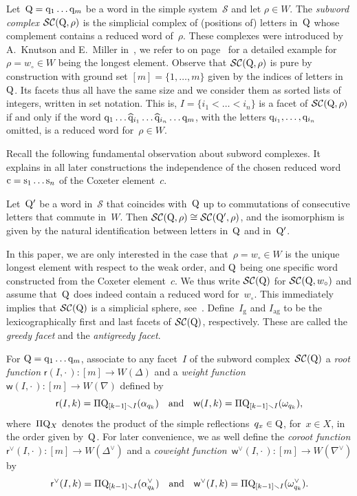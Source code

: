 \documentclass[ALCO,Unicode,ThmDefs]{cedram}
\newcommand{\ssm}{\smallsetminus}
\newcommand{\Dfn}[1]{\emph{#1}}
\newcommand{\subwordComplex}{\mathcal{SC}}
\newcommand{\greedy}{I_{\operatorname{g}}}
\newcommand{\antigreedy}{I_{\operatorname{ag}}}
\newcommand{\sq}[1]{{\rm #1}}
\newcommand{\Q}{\sq{Q}}
\newcommand{\q}{\sq{q}}
\newcommand{\s}{\sq{s}}
\newcommand{\sref}{\mathcal{S}}
\newcommand{\sfr}{\mathsf{r}}
\newcommand{\sfw}{\mathsf{w}}
\newcommand{\wo}{{w_\circ}}
\renewcommand{\c}{\sq{c}}
\newcommand{\Root}[2]{{\sfr}(#1,#2)}
\newcommand{\Weight}[2]{{\sfw}(#1,#2)}
\newcommand{\coRoot}[2]{{\sfr^\vee}(#1,#2)}
\newcommand{\coWeight}[2]{{\sfw^\vee}(#1,#2)}
\newcommand{\wordprod}[2]{\Pi{#1}_{#2}}
\begin{document}
Let~$\Q = \q_1\dots\q_m$ be a word in the simple system~$\sref$ and let $\rho \in W$. The \Dfn{subword complex} $\subwordComplex(\Q,\rho)$ is the simplicial complex of (positions of) letters in~$\Q$ whose complement contains a reduced word of~$\rho$. These complexes were introduced by A.~Knutson and E.~Miller in~\cite{KM2004}, we refer to  on page~\pageref{ex:subwordA2} for a detailed example for~$\rho = \wo \in W$ being the longest element. Observe that $\subwordComplex(\Q,\rho)$ is pure by construction with ground set $[m] = \{1,\dots,m\}$ given by the indices of letters in~$\Q$. Its facets thus all have the same size and we consider them as sorted lists of integers, written in set notation. This is, $I = \{i_1 < \dots < i_n\}$ is a facet of $\subwordComplex(\Q,\rho)$ if and only if the word $\q_1\dots \widehat \q_{i_1} \dots \widehat \q_{i_n} \dots \q_m$, with the letters $\q_{i_1},\dots,\q_{i_n}$ omitted, is a reduced word for~$\rho \in W$.


Recall the following fundamental observation about subword complexes. It explains in all later constructions the independence of the chosen reduced word~$\c = \s_1\dots\s_n$ of the Coxeter element~$c$.

\begin{lemm}\label{lem:commutation}
Let~$\Q'$ be a word in~$\sref$ that coincides with~$\Q$ up to commutations of consecutive letters that commute in~$W$. Then $\subwordComplex(\Q,\rho) \cong \subwordComplex(\Q',\rho)$, and the isomorphism is given by the natural identification between letters in~$\Q$ and in~$\Q'$.
\end{lemm}

In this paper, we are only interested in the case that~$\rho = \wo \in W$ is the unique longest element with respect to the weak order, and $\Q$ being one specific word constructed from the Coxeter element~$c$. We thus write $\subwordComplex(\Q)$ for $\subwordComplex(\Q,\wo)$ and assume that~$\Q$ does indeed contain a reduced word for~$\wo$. This immediately implies that $\subwordComplex(\Q)$ is a simplicial sphere, see~\cite[Theorem~3.7]{KM2004}. Define~$\greedy$ and $\antigreedy$ to be the lexicographically first and last facets of $\subwordComplex(\Q)$, respectively. These are called the \Dfn{greedy facet} and the \Dfn{antigreedy facet}.

For $\Q = \q_1 \dots \q_m$, associate to any facet~$I$ of the subword complex~$\subwordComplex(\Q)$ a \Dfn{root function} $\Root{I}{\cdot\,} : [m] \to W(\Delta)$ and a \Dfn{weight function}~$\Weight{I}{\cdot\,} : [m] \to W(\nabla)$ defined by
\[
\Root{I}{k} = \wordprod{\Q}{[k-1] \ssm I}(\alpha_{q_k}) \quad \text{and} \quad \Weight{I}{k} = \wordprod{\Q}{[k-1] \ssm I}(\omega_{q_k}),
\]
where~$\wordprod{\Q}{X}$ denotes the product of the simple reflections~$q_x \in \Q$, for~$x \in X$, in the order given by~$\Q$. For later convenience, we as well define the \Dfn{coroot function} $\coRoot{I}{\cdot\,} : [m] \to W(\Delta^\vee)$ and a \Dfn{coweight function}~$\coWeight{I}{\cdot\,} : [m] \to W(\nabla^\vee)$ by
\[
\coRoot{I}{k} = \wordprod{\Q}{[k-1] \ssm I}(\alpha_{q_k}^\vee) \quad \text{and} \quad \coWeight{I}{k} = \wordprod{\Q}{[k-1] \ssm I}(\omega_{q_k}^\vee).
\]
\end{document}
